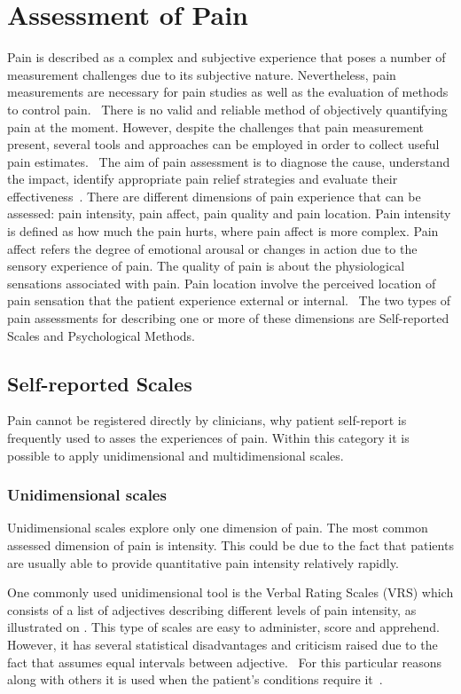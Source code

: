 \section{Assessment of Pain}
Pain is described as a complex and subjective experience that poses a number of measurement challenges due to its subjective nature. Nevertheless, pain measurements are necessary for pain studies as well as the evaluation of methods to control pain.~\cite{Jensen2001}
There is no valid and reliable method of objectively quantifying pain at the moment. However, despite the challenges that pain measurement present, several tools and approaches can be employed in order to collect useful pain estimates.~\cite{Younger2010} The aim of pain assessment is to diagnose the cause, understand the impact, identify appropriate pain relief strategies and evaluate their effectiveness~\cite{Briggs2010}. There are different dimensions of pain experience that can be assessed: pain intensity, pain affect, pain quality and pain location. Pain intensity is defined as how much the pain hurts, where pain affect is more complex. Pain affect refers the degree of emotional arousal or changes in action due to the sensory experience of pain. The quality of pain is about the physiological sensations associated with pain. Pain location involve the perceived location of pain sensation that the patient experience external or internal.~\cite{Jensen2001} The two types of pain assessments for describing one or more of these dimensions are Self-reported Scales and Psychological Methods. 

\subsection{Self-reported Scales}
Pain cannot be registered directly by clinicians, why patient self-report is frequently used to asses the experiences of pain. Within this category it is possible to apply unidimensional and multidimensional scales.~\cite{Jensen2001}

\subsubsection{Unidimensional scales}
Unidimensional scales explore only one dimension of pain. The most common assessed dimension of pain is intensity. This could be due to the fact that patients are usually able to provide quantitative pain intensity relatively rapidly.~\cite{Jensen2001}

One commonly used unidimensional tool is the Verbal Rating Scales (VRS) which consists of a list of adjectives describing different levels of pain intensity, as illustrated on . This type of scales are easy to administer, score and apprehend. However, it has several statistical disadvantages and criticism raised due to the fact that assumes equal intervals between adjective.~\cite{Jensen2001} For this particular reasons along with others it is used when the patient's conditions require it~\cite{Jensen1986}. 

